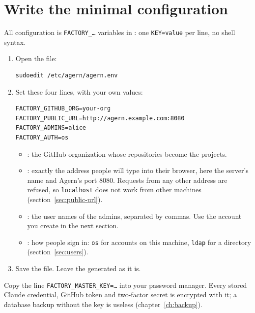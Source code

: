 \section{Write the minimal configuration}\label{sec:minimal-config}

All configuration is \texttt{FACTORY\_\ldots} variables in : one
\texttt{KEY=value} per line, no shell syntax.

\begin{enumerate}
  \item Open the file:
\begin{lstlisting}
sudoedit /etc/agern/agern.env
\end{lstlisting}
  \item Set these four lines, with your own values:
\begin{lstlisting}[style=conf]
FACTORY_GITHUB_ORG=your-org
FACTORY_PUBLIC_URL=http://agern.example.com:8080
FACTORY_ADMINS=alice
FACTORY_AUTH=os
\end{lstlisting}
    \begin{itemize}
      \item {}: the GitHub organization whose repositories become the projects.
      \item {}: exactly the address people will type into their browser,
        here the server's name and Agern's port 8080. Requests from any other address are
        refused, so \texttt{localhost} does not work from other machines (section~\ref{sec:public-url}).
      \item {}: the user names of the admins, separated by commas. Use the
        account you create in the next section.
      \item {}: how people sign in: \texttt{os} for accounts on this machine,
        \texttt{ldap} for a directory (section~\ref{sec:users}).
    \end{itemize}
  \item Save the file. Leave the generated  as it is.
\end{enumerate}

\begin{warning}
Copy the line \texttt{FACTORY\_MASTER\_KEY=\ldots} into your password manager. Every stored Claude
credential, GitHub token and two-factor secret is encrypted with it; a database backup without the
key is useless (chapter~\ref{ch:backup}).
\end{warning}

